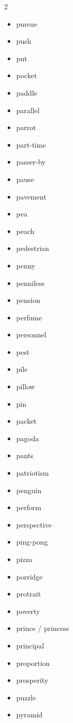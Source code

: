 \documentclass[../../book.tex]{subfiles}
\begin{document}
\begin{multicols}{2}
\begin{itemize}
\item[-] pursue
\item[-] push
\item[-] put
\item[-] pocket
\item[-] paddle
\item[-] parallel
\item[-] parrot
\item[-] part-time
\item[-] passer-by
\item[-] pause
\item[-] pavement
\item[-] pea
\item[-] peach
\item[-] pedestrian
\item[-] penny
\item[-] penniless
\item[-] pension
\item[-] perfume
\item[-] personnel
\item[-] pest
\item[-] pile
\item[-] pillow
\item[-] pin
\item[-] packet
\item[-] pagoda
\item[-] pants
\item[-] patriotism
\item[-] penguin
\item[-] perform
\item[-] perspective
\item[-] ping-pong
\item[-] pizza
\item[-] porridge
\item[-] protrait
\item[-] poverty
\item[-] prince / princess
\item[-] principal
\item[-] proportion
\item[-] prosperity
\item[-] puzzle
\item[-] pyramid
\end{itemize}
\end{multicols}
\end{document}
